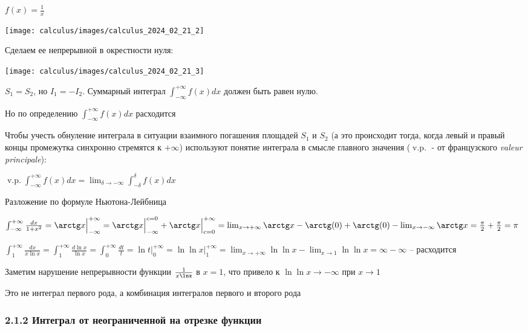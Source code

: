 \documentclass[12pt]{article}
\begin{document}
    \Ex $f(x) = \frac{1}{x}$

    \begin{center}
        \texttt{[image: calculus/images/calculus\_2024\_02\_21\_2]}
    \end{center}

    Сделаем ее непрерывной в окрестности нуля:

    \begin{center}
        \texttt{[image: calculus/images/calculus\_2024\_02\_21\_3]}
    \end{center}

    $S_1 = S_2$, но $I_1 = -I_2$. Суммарный интеграл $\displaystyle \int^{+\infty}_{-\infty} f(x) dx$ должен быть равен нулю.

    Но по определению $\displaystyle \int^{+\infty}_{-\infty} f(x) dx$ расходится

    Чтобы учесть обнуление интеграла в ситуации взаимного погашения площадей $S_1$ и $S_2$
    (а это происходит тогда, когда левый и правый концы промежутка синхронно стремятся к $+\infty$)
    используют понятие интеграла в смысле главного значения ($\operatorname{v.p.}$ - от французского \textit{valeur principale}):

    $\displaystyle \operatorname{v.p.} \int^{+\infty}_{-\infty} f(x) dx = \lim_{\delta \to -\infty} \int^{\delta}_{-\delta} f(x) dx$

    Разложение по формуле Ньютона-Лейбница

     $\int^{+\infty}_{-\infty} \frac{dx}{1 + x^2} = \arctg x \Big|^{+\infty}_{-\infty} = \arctg x \Big|^{c = 0}_{-\infty} + \arctg x \Big|^{+\infty}_{c = 0} =
    \lim_{x \to +\infty} \arctg x - \arctg(0) + \arctg(0) - \lim_{x \to -\infty} \arctg x = \frac{\pi}{2} + \frac{\pi}{2} = \pi$

     $\int^{+\infty}_{1} \frac{dx}{x\ln x} = \int^{+\infty}_{1} \frac{d\ln x}{\ln x} = \int^{+\infty}_{0} \frac{dt}{t}
     = \ln t \Big|^{+\infty}_{0} = \ln \ln x \Big|^{+\infty}_{1} = \lim_{x \to +\infty} \ln \ln x - \lim_{x \to 1} \ln \ln x = \infty - \infty$ -- расходится

    Заметим нарушение непрерывности функции $\frac{1}{x \lnx}$ в $x = 1$, что привело к $\ln \ln x \to -\infty$ при $x \to 1$

    Это не интеграл первого рода, а комбинация интегралов первого и второго рода

    \subsubsection{2.1.2 Интеграл от неограниченной на отрезке функции}
\end{document}
